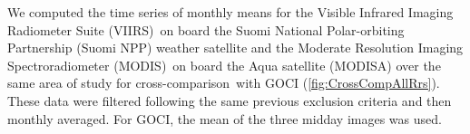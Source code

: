 \documentclass[onecolumn,3p,letterpaper,11pt]{elsarticle}
\begin{document}

    

    

We computed the time series of monthly means for the Visible Infrared Imaging Radiometer Suite (VIIRS)~on board the Suomi National Polar-orbiting Partnership (Suomi NPP) weather satellite and the Moderate Resolution Imaging Spectroradiometer (MODIS)~on board the Aqua satellite (MODISA) over the same area of study for cross-comparison~with GOCI (\autoref{fig:CrossCompAllRrs}). These data were filtered following the same previous exclusion criteria and then monthly averaged. For GOCI, the mean of the three midday images was used.
\end{document}
